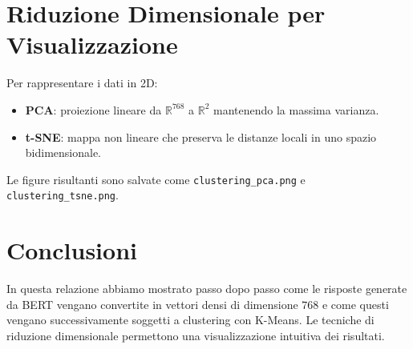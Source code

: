 \documentclass[a4paper,11pt]{article}
\begin{document}
\section{Riduzione Dimensionale per Visualizzazione}
Per rappresentare i dati in 2D:
\begin{itemize}
  \item \textbf{PCA}: proiezione lineare da $\mathbb{R}^{768}$ a $\mathbb{R}^2$ mantenendo la massima varianza.
  \item \textbf{t-SNE}: mappa non lineare che preserva le distanze locali in uno spazio bidimensionale.
\end{itemize}
Le figure risultanti sono salvate come \texttt{clustering\_pca.png} e \texttt{clustering\_tsne.png}.

\section{Conclusioni}
In questa relazione abbiamo mostrato passo dopo passo come le risposte generate da BERT vengano convertite in vettori densi di dimensione $768$ e come questi vengano successivamente soggetti a clustering con K-Means. Le tecniche di riduzione dimensionale permettono una visualizzazione intuitiva dei risultati.
\end{document}
